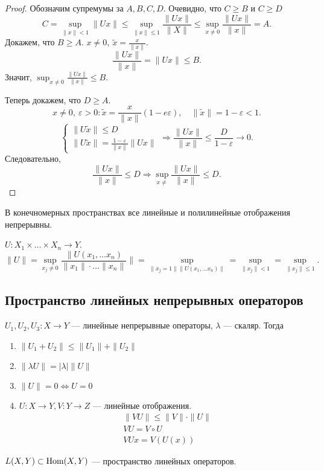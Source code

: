 \begin{proof}
     Обозначим супремумы за $ A, B, C, D$.
     Очевидно, что $ C \ge B$ и $  C \ge D$
     $$ C = \sup_{\|  x  \| < 1} \| Ux \| \le \sup_{\| x \| \le 1} \frac{\| Ux \| }{\| X \| } \le \sup _{x  \ne 0} \frac{\| Ux \| }{\| x \|  } = A.$$
     Докажем, что $ B \ge A$. $ x \ne 0, ~ \tilde x = \frac{x}{\| x \| }$. 
     \[
	 \frac{\| Ux \| }{\| x \| } = \| Ux \|  \le  B
     .\] 
     Значит, $ \sup_{x\ne 0} \frac{\| Ux \| }{\| x \| } \le B$.

     Теперь докажем, что  $ D \ge  A$.
     \[
	 x \ne 0, ~ \varepsilon >0\colon \tilde x = \frac{x}{\|  x \| }(1 -e \varepsilon ), \quad \|\tilde x \|  = 1 - \varepsilon  < 1
     .\] 
     \[
    \begin{cases}
        \| U\tilde x \| \le  D\\
	\| U\tilde x \|  = \frac{1- \varepsilon }{\|  x \| } \| Ux \| 
    \end{cases} 
\Longrightarrow \frac{\| Ux \| }{\| x \|}  \le \frac{D}{1 - \varepsilon } \to  0
     .\] 
     Следовательно, 
     \[
	 \frac{\|  Ux \| }{\| x \| } \le D \Longrightarrow \sup_{x \ne } \frac{\| Ux \| }{\| x \| } \le D
     .\] 
\end{proof}
\begin{rem}
    В конечномерных пространствах все линейные и полилинейные отображения непрерывны. 
\end{rem}
\begin{thm}
    $ U: X_1 \times \ldots \times X_n \to  Y $. \[
	\| U \|  = \sup_{x_j \ne 0} \frac{\| U(x_1, \ldots x_n)}{\| x_1 \| \cdot  \ldots \| x_n \| } \|  = \sup _{ \| x_j=1 \| \| U(x_1, \ldots x_n) \|  }  = \sup_{\|  x_j  \|  < 1} = \sup_{\| x_j \|  \le 1}
    .\]  
\end{thm}
\subsection{Пространство линейных непрерывных операторов}
\begin{thm}
    $ U_1, U_2, U_3 : X \to  Y$ --- линейные непрерывные операторы, $ \lambda $ --- скаляр. 
    Тогда 
    \begin{enumerate}
        \item $\| U_1 + U_2 \| \le \| U_1 \|  + \| U_2 \| $
	    \item $ \| \lambda U \|  = \lvert \lambda \rvert \| U \| $
	   \item $ \| U \| = 0 \Longleftrightarrow U = 0$
	   \item $ U: X \to  Y, V : Y \to Z$ --- линейные отображения.
	       \begin{align*}
		   &\| VU \|  \le \| V \|  \cdot \| U \| \\
		   &V U = V\circ U\\ 
		   &VUx = V(U(x))
	       \end{align*}
    \end{enumerate}
\end{thm}
\begin{name}
    $ L(X, Y) \subset {\mathop{\text{\rm Hom}}}(X, Y)$ --- пространство линейных операторов.
\end{name}
% 

